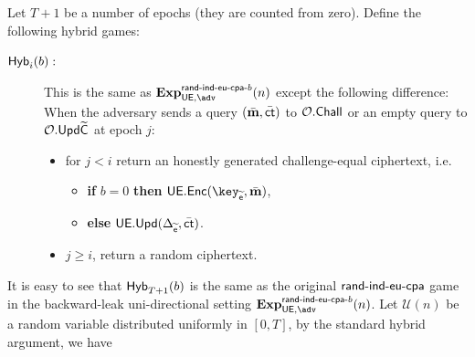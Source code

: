 \documentclass{fundam}
\begin{document}
Let $T+1$ be a number of epochs (they are counted from zero). Define the following hybrid games: 
\begin{description}
	\item[$\mathsf{Hyb}_{i}(b):$] This is the same as $\Exp{\UE,\adv}{\EUmod{b}}(n)$ except the following difference: When the adversary sends a query $(\bar{\mathbf{m}}, \bar{\mathsf{ct}})$ to $\mathcal{O}.\mathsf{Chall}$ or an empty query to $\mathcal{O}.\mathsf{Upd}\widetilde{\mathsf{C}}$ at epoch $j$:
	\begin{itemize}
		\item for $j<i$ return an honestly generated challenge-equal ciphertext, i.e. 
		\begin{itemize}
			\item[{}] \textbf{if} $b=0$ \textbf{then} $\ueenc(\key_{\widetilde{\epoch}}, \bar{\m})$,
			\item[{}] \textbf{else} $\mathsf{UE.Upd}(\Delta_{\widetilde{\mathsf{e}}}, \bar{\mathsf{ct}})$. 
		\end{itemize}
		\item $j\geq i$, return a random ciphertext.
	\end{itemize}
\end{description}
It is easy to see that $\mathsf{Hyb}_{T+1}(b)$ is the same as the original $\mathsf{rand{\text{-}} ind{\text{-}} eu{\text{-}} cpa}$	game in the backward-leak uni-directional setting $\Exp{\UE,\adv}{\EUmod{b}}(n)$. Let $\mathcal{U} (n)$ be a random variable distributed uniformly in $[0,T]$, by the standard hybrid argument, we have
\end{document}
